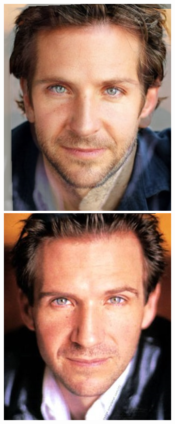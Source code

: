 \documentclass[conference]{IEEEtran}
\begin{document}
\begin{figure}[H]
\begin{multicols}{3}
    \includegraphics[width=1.0\linewidth]{results/faces/XL/img20.png} \par
    \includegraphics[width=1.0\linewidth]{results/faces/XL/img50.png} \par

\end{multicols}
\end{figure}
\end{document}
